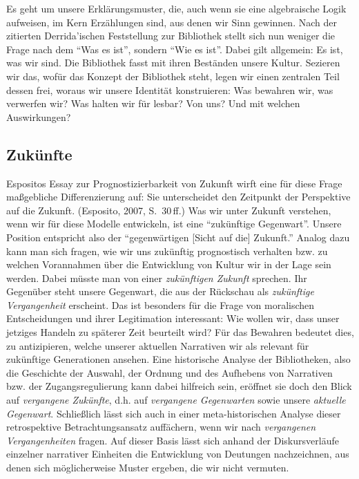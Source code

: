 \documentclass[output=paper]{langscibook}
\begin{document}
Es geht um unsere Erklärungsmuster, die, auch wenn sie eine algebraische
Logik aufweisen, im Kern Erzählungen sind, aus denen wir Sinn gewinnen.
Nach der zitierten Derrida'ischen Feststellung zur Bibliothek stellt
sich nun weniger die Frage nach dem \enquote{Was es ist}, sondern
\enquote{Wie es ist}. Dabei gilt allgemein: Es ist, was wir sind. Die
Bibliothek fasst mit ihren Beständen unsere Kultur. Sezieren wir das,
wofür das Konzept der Bibliothek steht, legen wir einen zentralen Teil
dessen frei, woraus wir unsere Identität konstruieren: Was bewahren wir,
was verwerfen wir? Was halten wir für lesbar? Von uns? Und mit welchen
Auswirkungen?

\hypertarget{zukuxfcnfte}{%
\subsection*{Zukünfte}\label{zukuxfcnfte}}

Espositos Essay zur Prognostizierbarkeit von Zukunft wirft eine für
diese Frage maßgebliche Differenzierung auf: Sie unterscheidet den
Zeitpunkt der Perspektive auf die Zukunft. (Esposito, 2007, S.~30\,ff.)
Was wir unter Zukunft verstehen, wenn wir für diese Modelle entwickeln,
ist eine \enquote{zukünftige Gegenwart}. Unsere Position entspricht also
der \enquote{gegenwärtigen {[}Sicht auf die{]} Zukunft.} Analog dazu
kann man sich fragen, wie wir uns zukünftig prognostisch verhalten bzw.
zu welchen Vorannahmen über die Entwicklung von Kultur wir in der Lage
sein werden. Dabei müsste man von einer \emph{zukünftigen Zukunft}
sprechen. Ihr Gegenüber steht unsere Gegenwart, die aus der Rückschau
als \emph{zukünftige Vergangenheit} erscheint. Das ist besonders für die
Frage von moralischen Entscheidungen und ihrer Legitimation interessant:
Wie wollen wir, dass unser jetziges Handeln zu späterer Zeit beurteilt
wird? Für das Bewahren bedeutet dies, zu antizipieren, welche unserer
aktuellen Narrativen wir als relevant für zukünftige Generationen
ansehen. Eine historische Analyse der Bibliotheken, also die Geschichte
der Auswahl, der Ordnung und des Aufhebens von Narrativen bzw. der
Zugangsregulierung kann dabei hilfreich sein, eröffnet sie doch den
Blick auf \emph{vergangene Zukünfte}, d.h. auf \emph{vergangene
Gegenwarten} sowie unsere \emph{aktuelle Gegenwart}. Schließlich lässt
sich auch in einer meta-historischen Analyse dieser retrospektive
Betrachtungsansatz auffächern, wenn wir nach \emph{vergangenen
Vergangenheiten} fragen. Auf dieser Basis lässt sich anhand der
Diskursverläufe einzelner narrativer Einheiten die Entwicklung von
Deutungen nachzeichnen, aus denen sich möglicherweise Muster ergeben,
die wir nicht vermuten.
\end{document}
